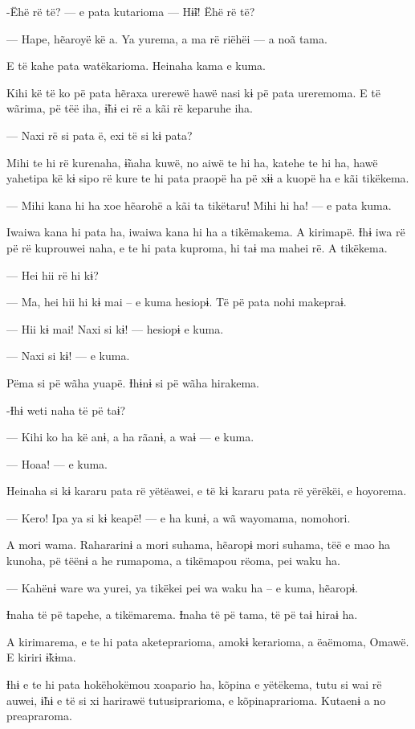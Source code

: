 -Ëhë rë të? --- e pata kutarioma --- Hɨ̃ɨ! Ëhë rë të? 

--- Hape, hẽaroyë kë a. Ya yurema, a ma rë riëhëi --- a noã tama. 

E të kahe pata watëkarioma. Heinaha kama e kuma. 

Kihi kë të ko pë pata hẽraxa urerewë hawë nasi kɨ pë pata ureremoma. E të wãrima, pë tëë iha, ɨ̃hɨ ei rë a kãi rë keparuhe iha. 

--- Naxi rë si pata ë, exi të si kɨ pata? 

Mihi te hi rë kurenaha, ɨ̃naha kuwë, no aiwë te hi ha, katehe te hi ha,
hawë yahetipa kë kɨ sipo rë kure te hi pata praopë ha pë xɨɨ a kuopë ha
e kãi tikëkema. 

--- Mihi kana hi ha xoe hẽarohë a kãi ta tikëtaru! Mihi hi ha! --- e pata
kuma. 

Iwaiwa kana hi pata ha, iwaiwa kana hi ha a tikëmakema. A kirimapë. Ɨhɨ
iwa rë pë rë kuprouwei naha, e te hi pata kuproma, hi taɨ ma mahei rë. A tikëkema. 

--- Hei hii rë hi kɨ? 

--- Ma, hei hii hi kɨ mai -- e kuma hesiopɨ. Të pë pata nohi makepraɨ. 

--- Hii kɨ mai! Naxi si kɨ! --- hesiopɨ e kuma. 

--- Naxi si kɨ! --- e kuma. 

Pëma si pë wãha yuapë. Ɨhɨnɨ si pë wãha hirakema. 

-Ɨhɨ weti naha të pë taɨ? 

--- Kihi ko ha kë anɨ, a ha rãanɨ, a waɨ --- e kuma. 

--- Hoaa! --- e kuma. 

Heinaha si kɨ kararu pata rë yëtëawei, e të kɨ kararu pata rë yërëkëi, e
hoyorema. 

--- Kero! Ipa ya si kɨ keapë! --- e ha kunɨ, a wã wayomama, nomohori. 

A mori wama. Rahararinɨ a mori suhama, hẽaropɨ mori suhama, tëë e mao ha
kunoha, pë tëënɨ a he rumapoma, a tikëmapou rëoma, pei waku ha. 

--- Kahënɨ ware wa yurei, ya tikëkei pei wa waku ha -- e kuma, hẽaropɨ.

Ɨnaha të pë tapehe, a tikëmarema. Ɨnaha të pë tama, të pë taɨ hiraɨ ha. 

A kirimarema, e te hi pata aketeprarioma, amokɨ kerarioma, a ëaëmoma,
Omawë. E kiriri ɨ̃kɨma. 

Ɨhɨ e te hi pata hokëhokëmou xoapario ha, kõpina e yëtëkema, tutu si wai
rë auwei, ɨ̃hɨ e të si xi harirawë tutusiprarioma, e kõpinaprarioma.
Kutaenɨ a no preapraroma. 

